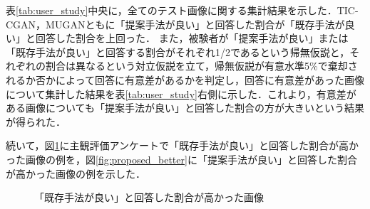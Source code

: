 \documentclass[11pt,dvipdfmx]{ujreport}
\begin{document}
表\ref{tab:user_study}中央に，全てのテスト画像に関する集計結果を示した．TIC-CGAN，MUGANともに「提案手法が良い」と回答した割合が「既存手法が良い」と回答した割合を上回った．
また，被験者が「提案手法が良い」または「既存手法が良い」と回答する割合がそれぞれ1/2であるという帰無仮説と，それぞれの割合は異なるという対立仮説を立て，帰無仮説が有意水準5\%で棄却されるか否かによって回答に有意差があるかを判定し，回答に有意差があった画像について集計した結果を表\ref{tab:user_study}右側に示した．これより，有意差がある画像についても「提案手法が良い」と回答した割合の方が大きいという結果が得られた．\par

続いて，図\ref{fig:existing_better}に主観評価アンケートで「既存手法が良い」と回答した割合が高かった画像の例を，図\ref{fig:proposed_better}に「提案手法が良い」と回答した割合が高かった画像の例を示した．

\begin{figure}[tb]
    \centering
    \caption{「既存手法が良い」と回答した割合が高かった画像}
    \label{fig:existing_better}
\end{figure}
\end{document}
